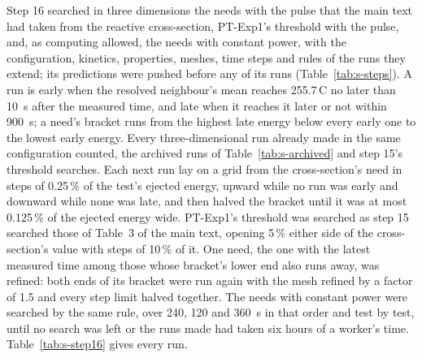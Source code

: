 \documentclass[preprint,12pt]{elsarticle}
\newcommand{\degC}{\,\textdegree C}
\begin{document}
Step 16 searched in three dimensions the needs with the pulse that the main text had taken from the reactive cross-section, PT-Exp1's threshold with the pulse, and, as computing allowed, the needs with constant power, with the configuration, kinetics, properties, meshes, time steps and rules of the runs they extend; its predictions were pushed before any of its runs (Table~\ref{tab:s-steps}). A run is early when the resolved neighbour's mean reaches 255.7\degC{} no later than 10~s after the measured time, and late when it reaches it later or not within 900~s; a need's bracket runs from the highest late energy below every early one to the lowest early energy. Every three-dimensional run already made in the same configuration counted, the archived runs of Table~\ref{tab:s-archived} and step 15's threshold searches. Each next run lay on a grid from the cross-section's need in steps of 0.25\,\% of the test's ejected energy, upward while no run was early and downward while none was late, and then halved the bracket until it was at most 0.125\,\% of the ejected energy wide. PT-Exp1's threshold was searched as step 15 searched those of Table~3 of the main text, opening 5\,\% either side of the cross-section's value with steps of 10\,\% of it. One need, the one with the latest measured time among those whose bracket's lower end also runs away, was refined: both ends of its bracket were run again with the mesh refined by a factor of 1.5 and every step limit halved together. The needs with constant power were searched by the same rule, over 240, 120 and 360~s in that order and test by test, until no search was left or the runs made had taken six hours of a worker's time. Table~\ref{tab:s-step16} gives every run.
\end{document}
